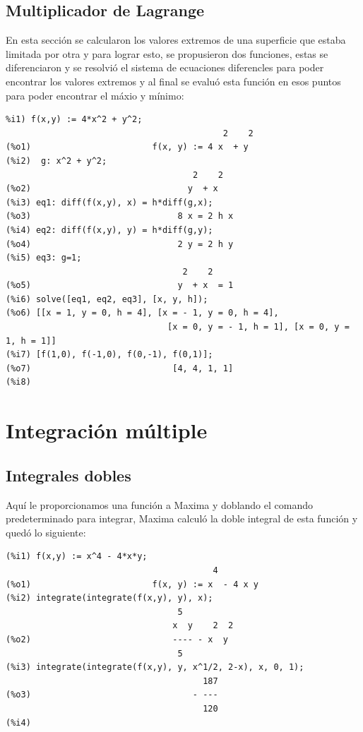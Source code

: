 \documentclass[12pt,letterpaper]{article}
\begin{document}
\subsection{Multiplicador de Lagrange}
En esta sección se calcularon los valores extremos de una superficie que estaba limitada por otra y para lograr esto, se propusieron dos funciones, estas se diferenciaron y se resolvió el sistema de ecuaciones diferencles para poder encontrar los valores extremos y al final se evaluó esta función en esos puntos para poder encontrar el máxio y mínimo:

\begin{verbatim}
%i1) f(x,y) := 4*x^2 + y^2;
                                           2    2
(%o1)                        f(x, y) := 4 x  + y
(%i2)  g: x^2 + y^2;
                                     2    2
(%o2)                               y  + x
(%i3) eq1: diff(f(x,y), x) = h*diff(g,x);
(%o3)                             8 x = 2 h x
(%i4) eq2: diff(f(x,y), y) = h*diff(g,y);
(%o4)                             2 y = 2 h y
(%i5) eq3: g=1;
                                   2    2
(%o5)                             y  + x  = 1
(%i6) solve([eq1, eq2, eq3], [x, y, h]);
(%o6) [[x = 1, y = 0, h = 4], [x = - 1, y = 0, h = 4], 
                                [x = 0, y = - 1, h = 1], [x = 0, y = 1, h = 1]]
(%i7) [f(1,0), f(-1,0), f(0,-1), f(0,1)];
(%o7)                            [4, 4, 1, 1]
(%i8) 
\end{verbatim}

\section{Integración múltiple}

\subsection{Integrales dobles}
Aquí le proporcionamos una función a Maxima y doblando el comando predeterminado para integrar, Maxima calculó la doble integral de esta función y quedó lo siguiente:

\begin{verbatim}
(%i1) f(x,y) := x^4 - 4*x*y;
                                         4
(%o1)                        f(x, y) := x  - 4 x y
(%i2) integrate(integrate(f(x,y), y), x);
                                  5
                                 x  y    2  2
(%o2)                            ---- - x  y
                                  5
(%i3) integrate(integrate(f(x,y), y, x^1/2, 2-x), x, 0, 1);
                                       187
(%o3)                                - ---
                                       120
(%i4) 
\end{verbatim}
\end{document}
